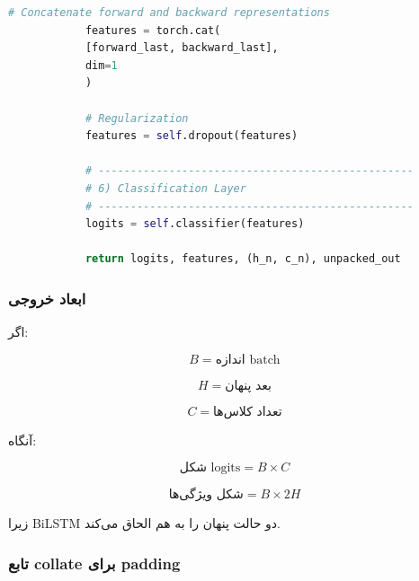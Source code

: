 \documentclass[12pt,a4paper]{article}
\begin{document}
\begin{tcolorbox}[colback=lightblue,colframe=mainblue,title=\textbf{کد کلاس RobustBiLSTM}]
\begin{latin}
\begin{lstlisting}[language=Python, caption={RobustBiLSTM Class - Full Implementation}]
			# Concatenate forward and backward representations
			features = torch.cat(
			[forward_last, backward_last],
			dim=1
			)
			
			# Regularization
			features = self.dropout(features)
			
			# -------------------------------------------------
			# 6) Classification Layer
			# -------------------------------------------------
			logits = self.classifier(features)
			
			return logits, features, (h_n, c_n), unpacked_out
		\end{lstlisting}
	\end{latin}
\end{tcolorbox}

\subsubsection{ابعاد خروجی}

اگر:

\[
B = \text{اندازه batch}
\]

\[
H = \text{بعد پنهان}
\]

\[
C = \text{تعداد کلاس‌ها}
\]

آنگاه:

\[
\text{شکل logits} = B \times C
\]

\[
\text{شکل ویژگی‌ها} = B \times 2H
\]

زیرا BiLSTM دو حالت پنهان را به هم الحاق می‌کند.

\subsubsection{تابع collate برای padding}
\end{document}
